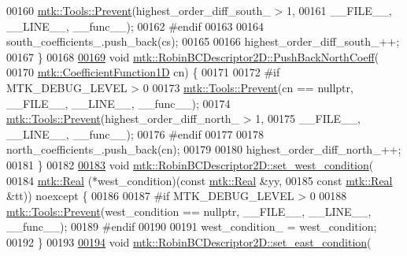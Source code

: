 \begin{DoxyCode}
00160   \hyperlink{classmtk_1_1Tools_a332324c6f25e66be9dff48c5987a3b9f}{mtk::Tools::Prevent}(highest\_order\_diff\_south\_ > 1,
00161                       \_\_FILE\_\_, \_\_LINE\_\_, \_\_func\_\_);
00162 \textcolor{preprocessor}{  #endif}
00163 
00164   south\_coefficients\_.push\_back(cs);
00165 
00166   highest\_order\_diff\_south\_++;
00167 \}
00168 
\hypertarget{mtk__robin__bc__descriptor__2d_8cc_source_l00169}{}\hyperlink{classmtk_1_1RobinBCDescriptor2D_abc6e299516af5d1c5c2d04797875b446}{00169} \textcolor{keywordtype}{void} \hyperlink{classmtk_1_1RobinBCDescriptor2D_abc6e299516af5d1c5c2d04797875b446}{mtk::RobinBCDescriptor2D::PushBackNorthCoeff}(
00170     \hyperlink{group__c07-mim__ops_gaa79593eeb6676d6011db339e01983909}{mtk::CoefficientFunction1D} cn) \{
00171 
00172 \textcolor{preprocessor}{  #if MTK\_DEBUG\_LEVEL > 0}
00173   \hyperlink{classmtk_1_1Tools_a332324c6f25e66be9dff48c5987a3b9f}{mtk::Tools::Prevent}(cn == \textcolor{keyword}{nullptr}, \_\_FILE\_\_, \_\_LINE\_\_, \_\_func\_\_);
00174   \hyperlink{classmtk_1_1Tools_a332324c6f25e66be9dff48c5987a3b9f}{mtk::Tools::Prevent}(highest\_order\_diff\_north\_ > 1,
00175                       \_\_FILE\_\_, \_\_LINE\_\_, \_\_func\_\_);
00176 \textcolor{preprocessor}{  #endif}
00177 
00178   north\_coefficients\_.push\_back(cn);
00179 
00180   highest\_order\_diff\_north\_++;
00181 \}
00182 
\hypertarget{mtk__robin__bc__descriptor__2d_8cc_source_l00183}{}\hyperlink{classmtk_1_1RobinBCDescriptor2D_aeaff87510dc1773effc0b5429579de23}{00183} \textcolor{keywordtype}{void} \hyperlink{classmtk_1_1RobinBCDescriptor2D_aeaff87510dc1773effc0b5429579de23}{mtk::RobinBCDescriptor2D::set\_west\_condition}(
00184     \hyperlink{group__c01-roots_gac080bbbf5cbb5502c9f00405f894857d}{mtk::Real} (*west\_condition)(\textcolor{keyword}{const} \hyperlink{group__c01-roots_gac080bbbf5cbb5502c9f00405f894857d}{mtk::Real} &yy,
00185                                 \textcolor{keyword}{const} \hyperlink{group__c01-roots_gac080bbbf5cbb5502c9f00405f894857d}{mtk::Real} &tt)) noexcept \{
00186 
00187 \textcolor{preprocessor}{  #if MTK\_DEBUG\_LEVEL > 0}
00188   \hyperlink{classmtk_1_1Tools_a332324c6f25e66be9dff48c5987a3b9f}{mtk::Tools::Prevent}(west\_condition == \textcolor{keyword}{nullptr}, \_\_FILE\_\_, \_\_LINE\_\_, \_\_func\_\_);
00189 \textcolor{preprocessor}{  #endif}
00190 
00191   west\_condition\_ = west\_condition;
00192 \}
00193 
\hypertarget{mtk__robin__bc__descriptor__2d_8cc_source_l00194}{}\hyperlink{classmtk_1_1RobinBCDescriptor2D_a94570f6e741bb00038c4bf81842d226c}{00194} \textcolor{keywordtype}{void} \hyperlink{classmtk_1_1RobinBCDescriptor2D_a94570f6e741bb00038c4bf81842d226c}{mtk::RobinBCDescriptor2D::set\_east\_condition}(

\end{DoxyCode}
